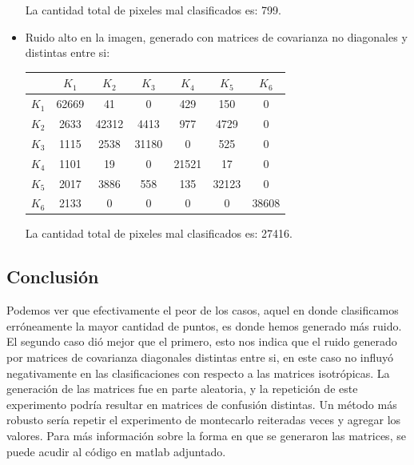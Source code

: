 \begin{itemize}
 La cantidad total de pixeles mal clasificados es: 799.
 
\item Ruido alto en la imagen, generado con matrices de covarianza no diagonales y distintas entre si:
\begin{center}
\begin{tabular}{c|c|c|c|c|c|c|}
    \cline{2-7}
     & \textcolor{lg}{$K_{1}$} & \textcolor{br}{$K_{2}$} & \textcolor{rr}{$K_{3}$} & \textcolor{dg}{$K_{4}$} & \textcolor{yy}{$K_{5}$} & \textcolor{bb}{$K_{6}$} \\
    \hline
    \multicolumn{1}{|c|}{\textcolor{lg}{$K_{1}$}} & 62669 & 41    & 0     & 429   & 150   & 0     \\
    \multicolumn{1}{|c|}{\textcolor{br}{$K_{2}$}} & 2633  & 42312 & 4413  & 977   & 4729  & 0     \\
    \multicolumn{1}{|c|}{\textcolor{rr}{$K_{3}$}} & 1115  & 2538  & 31180 & 0     & 525   & 0     \\
    \multicolumn{1}{|c|}{\textcolor{dg}{$K_{4}$}} & 1101  & 19    & 0     & 21521 & 17    & 0     \\
    \multicolumn{1}{|c|}{\textcolor{yy}{$K_{5}$}} & 2017  & 3886  & 558   & 135   & 32123 & 0     \\
    \multicolumn{1}{|c|}{\textcolor{bb}{$K_{6}$}} & 2133  & 0     & 0     & 0     & 0     & 38608 \\
    \hline
\end{tabular}
\end{center}

La cantidad total de pixeles mal clasificados es: 27416.

\end{itemize}

\subsection{Conclusión}
Podemos ver que efectivamente el peor de los casos, aquel en donde clasificamos erróneamente la mayor cantidad de puntos, es donde hemos generado más ruido. El segundo caso dió mejor que el primero, esto nos indica que el ruido generado por matrices de covarianza diagonales distintas entre si, en este caso no influyó negativamente en las clasificaciones con respecto a las matrices isotrópicas. La generación de las matrices fue en parte aleatoria, y la repetición de este experimento podría resultar en matrices de confusión distintas. Un método más robusto sería repetir el experimento de montecarlo reiteradas veces y agregar los valores. Para más información sobre la forma en que se generaron las matrices, se puede acudir al código en matlab adjuntado.

